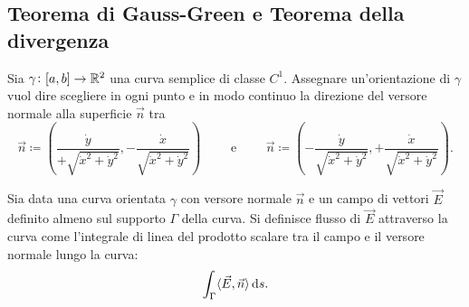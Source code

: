 \subsection{Teorema di Gauss-Green e Teorema della divergenza}

\begin{definition}
	Sia $ \gamma \colon [a, b] \to \mathbb{R}^2 $ una curva semplice di classe $ C^1 $. Assegnare un'orientazione di $ \gamma $ vuol dire scegliere in ogni punto e in modo continuo la direzione del versore normale alla superficie $ \vec{n} $ tra 
	\[
		\vec{n} \coloneqq \left(\frac{\dot{y}}{+\sqrt{\dot{x}^2 + \dot{y}^2}}, -\frac{\dot{x}}{\sqrt{\dot{x}^2 + \dot{y}^2}} \right) 
		\qquad \text{ e } \qquad
		\vec{n} \coloneqq \left(-\frac{\dot{y}}{\sqrt{\dot{x}^2 + \dot{y}^2}}, +\frac{\dot{x}}{\sqrt{\dot{x}^2 + \dot{y}^2}} \right).
	\]
\end{definition}

\begin{definition}
	Sia data una curva orientata $ \gamma $ con versore normale $ \vec{n} $ e un campo di vettori $ \vec{E} $ definito almeno sul supporto $ \Gamma $ della curva. Si definisce flusso di $ \vec{E} $ attraverso la curva come l'integrale di linea del prodotto scalare tra il campo e il versore normale lungo la curva: 
	\[
		\int_{\Gamma} \langle {\vec{E}, \vec{n}} \rangle \dif{s}.
	\]
\end{definition}

